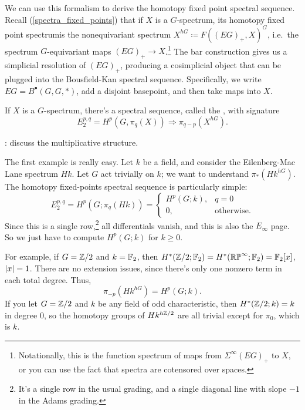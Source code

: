 We can use this formalism to derive the homotopy fixed point spectral sequence. Recall
(\cref{spectra_fixed_points}) that if $X$ is a $G$-spectrum, its homotopy fixed point spectrumis the nonequivariant spectrum $X^{hG}\coloneqq F((EG)_+, X)^G$, i.e.\ the spectrum
$G$-equivariant maps $(EG)_+\to X$.\footnote{Notationally, this is the function spectrum of maps from
$\Sigma^\infty (EG)_+$ to $X$, or you can use the fact that spectra are cotensored over spaces.} The bar
construction gives us a simplicial resolution of $(EG)_+$, producing a cosimplicial object
that can be plugged into the Bousfield-Kan spectral sequence.  Specifically, we write $EG = B^\bullet(G,G,*)$, add
a disjoint basepoint, and then take maps into $X$.
\begin{thm}
\label{HFPSS}
If $X$ is a $G$-spectrum, there's a spectral sequence, called the
, with signature
\[E_2^{p,q} = H^p(G, \pi_q(X))\Longrightarrow \pi_{q-p}(X^{hG}).\]
\end{thm}
\TODO: discuss the multiplicative structure.
\begin{exm}
The first example is really easy. Let $k$ be a field, and consider the Eilenberg-Mac Lane spectrum $Hk$. Let $G$
act trivially on $k$; we want to understand $\pi_*(Hk^{hG})$. The homotopy fixed-points spectral sequence is
particularly simple:
\[E_2^{p,q} = H^p(G; \pi_q(Hk)) = \begin{cases}
	H^p(G; k), &q = 0\\
	0, &\text{otherwise.}
\end{cases}\]
Since this is a single row,\footnote{It's a single row in the usual grading, and a single diagonal line with slope
$-1$ in the Adams grading.} all differentials vanish, and this is also the $E_\infty$ page. So
we just have to compute $H^p(G;k)$ for $k\ge 0$.

For example, if $G = \mathbb Z/2$ and $k = \mathbb F_2$, then $H^*(\mathbb Z/2; \mathbb F_2) = H^*(\mathbb{RP}^\infty;\mathbb F_2) = \mathbb F_2[x]$, $\lvert x\rvert = 1$.
There are no extension issues, since there's only one nonzero term in each total degree. Thus,
\[\pi_{-p}(Hk^{hG}) = H^p(G; k).\]
If you let $G = \mathbb Z/2$ and $k$ be any field of odd characteristic, then $H^*(\mathbb Z/2; k) = k$ in degree $0$, so the
homotopy groups of $Hk^{h\mathbb Z/2}$ are all trivial except for $\pi_0$, which is $k$.
\end{exm}
